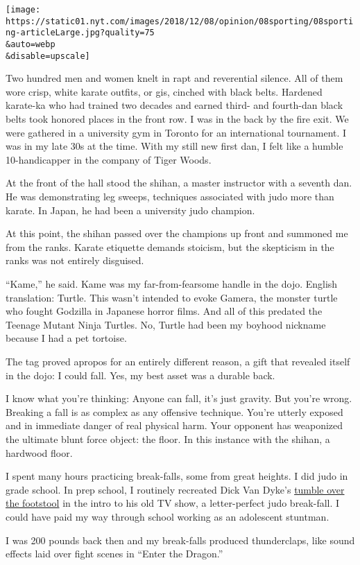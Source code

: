 \texttt{[image: https://static01.nyt.com/images/2018/12/08/opinion/08sporting/08sporting-articleLarge.jpg?quality=75\\\&auto=webp\\\&disable=upscale]}

Two hundred men and women knelt in rapt and reverential silence. All of
them wore crisp, white karate outfits, or gis, cinched with black belts.
Hardened karate-ka who had trained two decades and earned third- and
fourth-dan black belts took honored places in the front row. I was in
the back by the fire exit. We were gathered in a university gym in
Toronto for an international tournament. I was in my late 30s at the
time. With my still new first dan, I felt like a humble 10-handicapper
in the company of Tiger Woods.

At the front of the hall stood the shihan, a master instructor with a
seventh dan. He was demonstrating leg sweeps, techniques associated with
judo more than karate. In Japan, he had been a university judo champion.

At this point, the shihan passed over the champions up front and
summoned me from the ranks. Karate etiquette demands stoicism, but the
skepticism in the ranks was not entirely disguised.

``Kame,'' he said. Kame was my far-from-fearsome handle in the dojo.
English translation: Turtle. This wasn't intended to evoke Gamera, the
monster turtle who fought Godzilla in Japanese horror films. And all of
this predated the Teenage Mutant Ninja Turtles. No, Turtle had been my
boyhood nickname because I had a pet tortoise.

The tag proved apropos for an entirely different reason, a gift that
revealed itself in the dojo: I could fall. Yes, my best asset was a
durable back.

I know what you're thinking: Anyone can fall, it's just gravity. But
you're wrong. Breaking a fall is as complex as any offensive technique.
You're utterly exposed and in immediate danger of real physical harm.
Your opponent has weaponized the ultimate blunt force object: the floor.
In this instance with the shihan, a hardwood floor.

I spent many hours practicing break-falls, some from great heights. I
did judo in grade school. In prep school, I routinely recreated Dick Van
Dyke's \href{https://www.youtube.com/watch?v=BttXQJ_gDnc}{tumble over
the footstool} in the intro to his old TV show, a letter-perfect judo
break-fall. I could have paid my way through school working as an
adolescent stuntman.

I was 200 pounds back then and my break-falls produced thunderclaps,
like sound effects laid over fight scenes in ``Enter the Dragon.''

